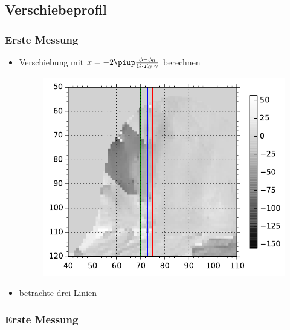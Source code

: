 \documentclass{beamer}
\begin{document}
    \subsection{Verschiebeprofil}


	\begin{frame}
        \frametitle{Erste Messung}
        \begin{itemize}
            \item 
                Verschiebung mit $x = -2\piup\frac{\phi-\phi_0}{G\cdot T_G\cdot\gamma}$ berechnen
                \begin{figure}
                    \centering
                    \includegraphics[width=.4\textwidth]{../Abbildungen/dis_standart_lines.pdf}
                \end{figure}
            \item
                betrachte drei Linien
        \end{itemize}
	\end{frame}


	\begin{frame}
		\frametitle{Erste Messung}
        \begin{figure}
            \centering
        \end{figure}
    \end{frame}
\end{document}
